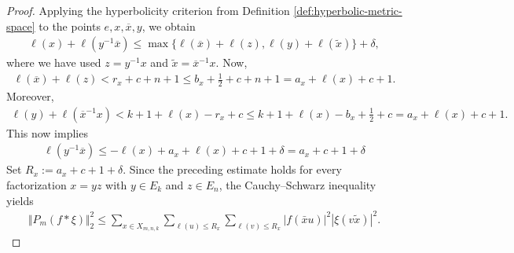 \documentclass[12pt,a4paper,oneside,final,reqno]{amsart}
\theoremstyle{plain}
\theoremstyle{definition}
\begin{document}
\begin{proof}
    Applying the hyperbolicity criterion from Definition \ref{def:hyperbolic-metric-space} to the points $e, x, \overline{x}, y$, we obtain
    \begin{align*}
        \ell(x) + \ell(y^{-1}\overline{x}) \leq \max \{ \ell(\overline{x}) + \ell(z) , \ell(y) + \ell(\tilde{x}) \} + \delta, 
    \end{align*}
    where we have used $z = y^{-1}x$ and $\tilde{x} = \overline{x}^{-1}x$. Now,
    \begin{align*}
        \ell(\overline{x}) + \ell(z) < r_x + c  + n +1 \leq b_x + \frac{1}{2} + c + n+1 = a_x + \ell(x) + c + 1.
    \end{align*}
    Moreover,
    \begin{align*}
        \ell(y) + \ell(\overline{x}^{-1}x) < k+1 + \ell(x) - r_x +c \leq k+1 +\ell(x) -b_x + \frac{1}{2} +c  = a_x + \ell(x) +c + 1.
    \end{align*}
    This now implies
    \begin{align*}
        \ell(y^{-1}\overline{x}) \leq - \ell(x) + a_x + \ell(x) + c + 1 + \delta = a_x + c +1+\delta
    \end{align*}
    Set $R_x := a_x + c+ 1 +\delta$. 
    Since the preceding estimate holds for every factorization $x = yz$ with $y \in E_k$ and $z \in E_n$, the Cauchy--Schwarz inequality yields
    \begin{align*}
        \Vert P_m(f*\xi)\Vert_2^2
\leq
\sum_{x\in X_{m,n,k}}
\sum_{\ell(u)\leq R_x}
\sum_{\ell(v)\leq R_x}
|f(\bar xu)|^2|\xi(v\widetilde x)|^2.
    \end{align*}


\end{proof}
\end{document}
